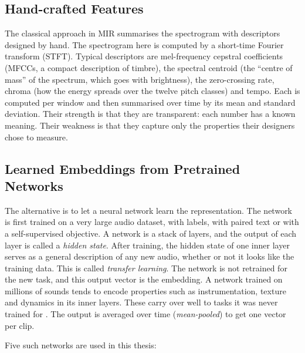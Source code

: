 \subsection{Hand-crafted Features}

The classical approach in MIR summarises the spectrogram with descriptors designed by hand. The spectrogram here is computed by a short-time Fourier transform (STFT). Typical descriptors are mel-frequency cepstral coefficients (MFCCs, a compact description of timbre), the spectral centroid (the ``centre of mass'' of the spectrum, which goes with brightness), the zero-crossing rate, chroma (how the energy spreads over the twelve pitch classes) and tempo. Each is computed per window and then summarised over time by its mean and standard deviation. Their strength is that they are transparent: each number has a known meaning. Their weakness is that they capture only the properties their designers chose to measure.

\subsection{Learned Embeddings from Pretrained Networks}

The alternative is to let a neural network learn the representation. The network is first trained on a very large audio dataset, with labels, with paired text or with a self-supervised objective. A network is a stack of layers, and the output of each layer is called a \emph{hidden state}. After training, the hidden state of one inner layer serves as a general description of any new audio, whether or not it looks like the training data. This is called \emph{transfer learning}. The network is not retrained for the new task, and this output vector is the embedding. A network trained on millions of sounds tends to encode properties such as instrumentation, texture and dynamics in its inner layers. These carry over well to tasks it was never trained for \citep{choi2017transfer}. The output is averaged over time (\emph{mean-pooled}) to get one vector per clip.

Five such networks are used in this thesis:

